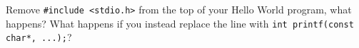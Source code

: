 %
Remove \texttt{#include <stdio.h>} from the top of your Hello
World program, what happens?  What happens if you instead replace the
line with \texttt{int printf(const char*, ...);}?
